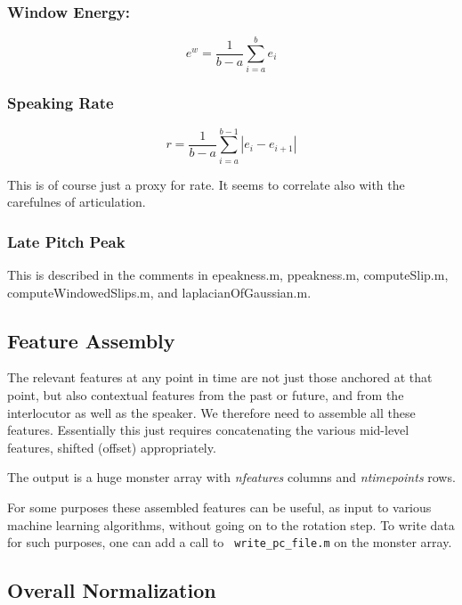 \documentclass[11pt]{article}
\begin{document}
\bigskip
\subsubsection{Window Energy:}

\begin{equation}
e^w = \frac{1}{b - a} \sum\limits_{i=a}^{b}e_i
\end{equation}

\subsubsection{Speaking Rate}
\begin{equation}
r = \frac{1}{b - a} \sum\limits_{i=a}^{b-1}|e_i - e_{i+1}|
\end{equation}

This is of course just a proxy for rate.  It seems to correlate also
with the carefulnes of articulation.

\subsubsection{Late Pitch Peak}

This is described in the comments in epeakness.m, ppeakness.m,
computeSlip.m, computeWindowedSlips.m, and laplacianOfGaussian.m. 


\subsection{Feature Assembly}

The relevant features at any point in time are not just those anchored
at that point, but also contextual features from the past or future,
and from the interlocutor as well as the speaker.  We therefore need
to assemble all these features.  Essentially this just requires
concatenating the various mid-level features, shifted (offset)
appropriately.

The output is a huge monster array with {\it nfeatures} columns and
{\it ntimepoints} rows.

For some purposes these assembled features can be useful, as input to
various machine learning algorithms, without going on to the rotation
step.  To write data for such purposes, one can add a call to {\tt
  write\_pc\_file.m} on the monster array.


\subsection{Overall Normalization}
\end{document}
